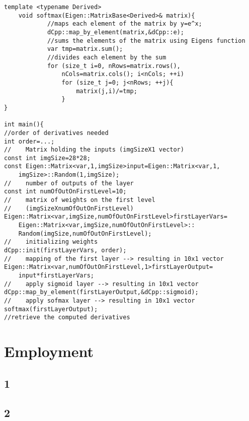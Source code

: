 \documentclass{article}
\begin{document}
\begin{lstlisting}
template <typename Derived>
    void softmax(Eigen::MatrixBase<Derived>& matrix){
            //maps each element of the matrix by y=e^x;
            dCpp::map_by_element(matrix,&dCpp::e);
            //sums the elements of the matrix using Eigens function
            var tmp=matrix.sum();
            //divides each element by the sum
            for (size_t i=0, nRows=matrix.rows(), 
            	nCols=matrix.cols(); i<nCols; ++i)
                for (size_t j=0; j<nRows; ++j){
                    matrix(j,i)/=tmp;
                }
}

int main(){
//order of derivatives needed
int order=...;
//    Matrix holding the inputs (imgSizeX1 vector)
const int imgSize=28*28;
const Eigen::Matrix<var,1,imgSize>input=Eigen::Matrix<var,1,
	imgSize>::Random(1,imgSize);
//    number of outputs of the layer
const int numOfOutOnFirstLevel=10;
//    matrix of weights on the first level 
//    (imgSizeXnumOfOutOnFirstLevel)
Eigen::Matrix<var,imgSize,numOfOutOnFirstLevel>firstLayerVars=
	Eigen::Matrix<var,imgSize,numOfOutOnFirstLevel>::
	Random(imgSize,numOfOutOnFirstLevel);
//    initializing weights
dCpp::init(firstLayerVars, order);
//    mapping of the first layer --> resulting in 10x1 vector
Eigen::Matrix<var,numOfOutOnFirstLevel,1>firstLayerOutput=
	input*firstLayerVars;
//    apply sigmoid layer --> resulting in 10x1 vector
dCpp::map_by_element(firstLayerOutput,&dCpp::sigmoid);
//    apply sofmax layer --> resulting in 10x1 vector
softmax(firstLayerOutput);
//retrieve the computed derivatives
\end{lstlisting}

\section{Employment}\label{sec:Employment}
\subsection{1}
\subsection{2}

  \printbibliography
  
\end{document}
